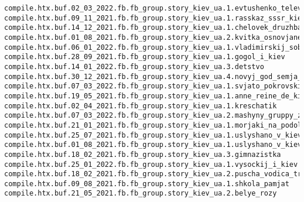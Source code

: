 \begin{Verbatim}
compile.htx.buf.02_03_2022.fb.fb_group.story_kiev_ua.1.evtushenko_televyshka
compile.htx.buf.09_11_2021.fb.fb_group.story_kiev_ua.1.rasskaz_sssr_kiev
compile.htx.buf.14_12_2021.fb.fb_group.story_kiev_ua.1.chelovek_druzhba
compile.htx.buf.01_08_2021.fb.fb_group.story_kiev_ua.2.kvitka_osnovjanenko_pismo
compile.htx.buf.06_01_2022.fb.fb_group.story_kiev_ua.1.vladimirskij_sobor
compile.htx.buf.28_09_2021.fb.fb_group.story_kiev_ua.1.gogol_i_kiev
compile.htx.buf.14_01_2022.fb.fb_group.story_kiev_ua.3.detstvo
compile.htx.buf.30_12_2021.fb.fb_group.story_kiev_ua.4.novyj_god_semja_1950
compile.htx.buf.07_03_2022.fb.fb_group.story_kiev_ua.1.svjato_pokrovskij_molitva
compile.htx.buf.19_05_2021.fb.fb_group.story_kiev_ua.1.anne_reine_de_kiev
compile.htx.buf.02_04_2021.fb.fb_group.story_kiev_ua.1.kreschatik
compile.htx.buf.07_03_2022.fb.fb_group.story_kiev_ua.2.mashyny_gruppy_zet
compile.htx.buf.21_01_2021.fb.fb_group.story_kiev_ua.1.morjaki_na_podole
compile.htx.buf.25_07_2021.fb.fb_group.story_kiev_ua.1.uslyshano_v_kieve_6
compile.htx.buf.01_08_2021.fb.fb_group.story_kiev_ua.1.uslyshano_v_kieve_9
compile.htx.buf.18_02_2021.fb.fb_group.story_kiev_ua.3.gimnazistka
compile.htx.buf.25_01_2022.fb.fb_group.story_kiev_ua.1.vysockij_i_kiev
compile.htx.buf.18_02_2021.fb.fb_group.story_kiev_ua.2.puscha_vodica_tramvaj_marshrut
compile.htx.buf.09_08_2021.fb.fb_group.story_kiev_ua.1.shkola_pamjat
compile.htx.buf.21_05_2021.fb.fb_group.story_kiev_ua.2.belye_rozy
\end{Verbatim}
